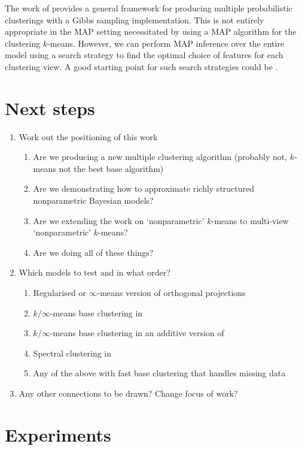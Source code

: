 \documentclass{article}
\numberwithin{equation}{section}
\numberwithin{thm}{section}
\begin{document}
The work of \citep{Niu2012} provides a general framework for producing multiple probabilistic clusterings with a Gibbs sampling implementation.
This is not entirely appropriate in the MAP setting necessitated by using a MAP algorithm for the clustering \ie $k$-means.
However, we can perform MAP inference over the entire model using a search strategy to find the optimal choice of features for each clustering view.
A good starting point for such search strategies could be \cite{Dy2004}.

\section{Next steps}

\begin{enumerate}
\item Work out the positioning of this work
\begin{enumerate}
\item Are we producing a new multiple clustering algorithm (probably not, $k$-means not the best base algorithm)
\item Are we demonstrating how to approximate richly structured nonparametric Bayesian models?
\item Are we extending the work on `nonparametric' $k$-means to multi-view `nonparametric' $k$-means?
\item Are we doing all of these things?
\end{enumerate}
\item Which models to test and in what order?
\begin{enumerate}
\item Regularised or $\infty$-means version of orthogonal projections
\item $k/\infty$-means base clustering in \cite{Niu2012}
\item $k/\infty$-means base clustering in an additive version of \cite{Niu2012}
\item Spectral clustering in \cite{Niu2012}
\item Any of the above with fast base clustering that handles missing data
\end{enumerate}
\item Any other connections to be drawn? Change focus of work?
\end{enumerate}

\section{Experiments}
\end{document}
